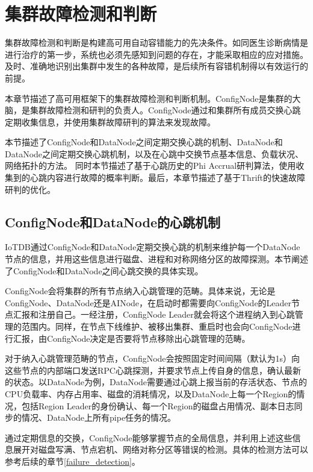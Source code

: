 
\chapter{集群故障检测和判断}

集群故障检测和判断是构建高可用自动容错能力的先决条件。如同医生诊断病情是进行治疗的第一步，系统也必须先感知到问题的存在，才能采取相应的应对措施。及时、准确地识别出集群中发生的各种故障，是后续所有容错机制得以有效运行的前提。

本章节描述了高可用框架下的集群故障检测和判断机制。ConfigNode是集群的大脑，是集群故障检测和研判的负责人。ConfigNode通过和集群所有成员交换心跳定期收集信息，并使用集群故障研判的算法来发现故障。

本节描述了ConfigNode和DataNode之间定期交换心跳的机制、DataNode和DataNode之间定期交换心跳机制，以及在心跳中交换节点基本信息、负载状况、网络拓扑的方法。
同时本节描述了基于心跳历史的Phi Accrual研判算法，使用收集到的心跳内容进行故障的概率判断。最后，本章节描述了基于Thrift的快速故障研判的优化。

\section{ConfigNode和DataNode的心跳机制}

IoTDB通过ConfigNode和DataNode定期交换心跳的机制来维护每一个DataNode节点的信息，并用这些信息进行磁盘、进程和对称网络分区的故障探测。本节阐述了ConfigNode和DataNode之间心跳交换的具体实现。

ConfigNode会将集群的所有节点纳入心跳管理的范畴。具体来说，无论是ConfigNode、DataNode还是AINode，在启动时都需要向ConfigNode的Leader节点汇报和注册自己。一经注册，ConfigNode Leader就会将这个进程纳入到心跳管理的范围内。同样，在节点下线维护、被移出集群、重启时也会向ConfigNode进行汇报，由ConfigNode决定是否要将节点移除出心跳管理的范畴。

对于纳入心跳管理范畴的节点，ConfigNode会按照固定时间间隔（默认为1s）向这些节点的内部端口发送RPC心跳探测，并要求节点上传自身的信息，确认最新的状态。以DataNode为例，DataNode需要通过心跳上报当前的存活状态、节点的CPU负载率、内存占用率、磁盘的消耗情况，以及DataNode上每一个Region的情况，包括Region Leader的身份确认、每一个Region的磁盘占用情况、副本日志同步的情况、DataNode上所有pipe任务的情况。

通过定期信息的交换，ConfigNode能够掌握节点的全局信息，并利用上述这些信息展开对磁盘写满、节点宕机、网络对称分区等错误的检测。具体的检测方法可以参考后续的章节\ref{failure_detection}。

